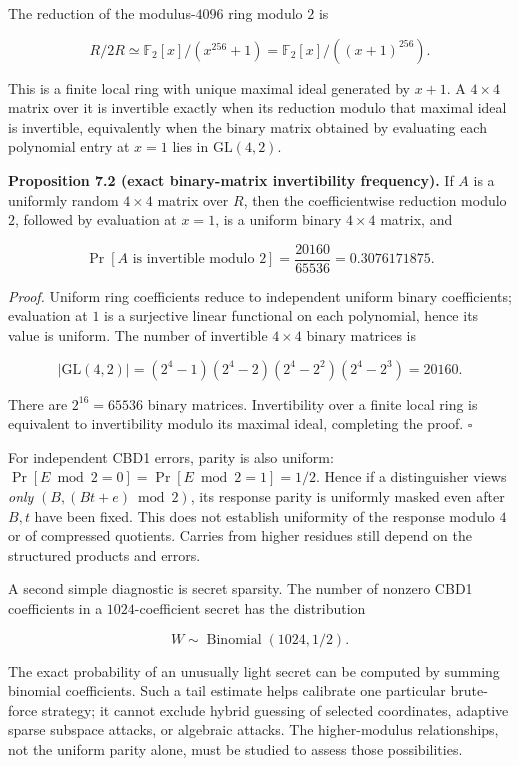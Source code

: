 \documentclass[
  11pt,
  a4paper,
  oneside]{report}
\begin{document}
The reduction of the modulus-\(4096\) ring modulo \(2\) is

\[
R/2R\simeq\mathbb F_2[x]/(x^{256}+1)
=\mathbb F_2[x]/((x+1)^{256}).
\]

This is a finite local ring with unique maximal ideal generated by
\(x+1\). A \(4\times4\) matrix over it is invertible exactly when its
reduction modulo that maximal ideal is invertible, equivalently when the
binary matrix obtained by evaluating each polynomial entry at \(x=1\)
lies in \(\mathrm{GL}(4,2)\).

\textbf{Proposition 7.2 (exact binary-matrix invertibility frequency).}
If \(A\) is a uniformly random \(4\times4\) matrix over \(R\), then the
coefficientwise reduction modulo \(2\), followed by evaluation at
\(x=1\), is a uniform binary \(4\times4\) matrix, and

\[
\Pr[A\text{ is invertible modulo }2]
=\frac{20160}{65536}=0.3076171875.
\]

\emph{Proof.} Uniform ring coefficients reduce to independent uniform
binary coefficients; evaluation at \(1\) is a surjective linear
functional on each polynomial, hence its value is uniform. The number of
invertible \(4\times4\) binary matrices is

\[
|\mathrm{GL}(4,2)|
=(2^4-1)(2^4-2)(2^4-2^2)(2^4-2^3)=20160.
\]

There are \(2^{16}=65536\) binary matrices. Invertibility over a finite
local ring is equivalent to invertibility modulo its maximal ideal,
completing the proof. \(\square\)

For independent CBD1 errors, parity is also uniform:
\(\Pr[E\bmod2=0]=\Pr[E\bmod2=1]=1/2\). Hence if a distinguisher views
\emph{only} \((B,(Bt+e)\bmod2)\), its response parity is uniformly
masked even after \(B,t\) have been fixed. This does not establish
uniformity of the response modulo \(4\) or of compressed quotients.
Carries from higher residues still depend on the structured products and
errors.

A second simple diagnostic is secret sparsity. The number of nonzero
CBD1 coefficients in a \(1024\)-coefficient secret has the distribution

\[
W\sim\operatorname{Binomial}(1024,1/2).
\]

The exact probability of an unusually light secret can be computed by
summing binomial coefficients. Such a tail estimate helps calibrate one
particular brute-force strategy; it cannot exclude hybrid guessing of
selected coordinates, adaptive sparse subspace attacks, or algebraic
attacks. The higher-modulus relationships, not the uniform parity alone,
must be studied to assess those possibilities.
\end{document}
